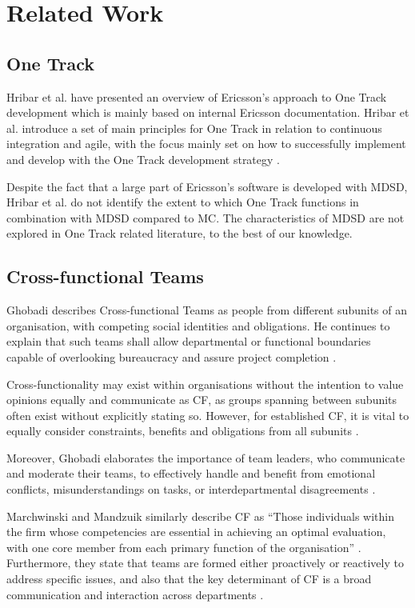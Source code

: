 \documentclass[fina_report_innit.tex]{subfiles}
\begin{document}
\section{Related Work}


\subsection{One Track}
Hribar et al. \cite{hribar2008first} have presented an overview of Ericsson's approach to One Track development which is mainly based on internal Ericsson documentation. Hribar et al. introduce a set of main principles for One Track in relation to continuous integration and agile, with the focus mainly set on how to successfully implement and develop with the One Track development strategy \cite{hribar2008first}.

Despite the fact that a large part of Ericsson's software is developed with MDSD, Hribar et al. do not identify the extent to which One Track functions in combination with MDSD compared to MC. The characteristics of MDSD are not explored in One Track related literature, to the best of our knowledge.

\subsection{Cross-functional Teams}
Ghobadi describes Cross-functional Teams as people from different subunits of an organisation, with competing social identities and obligations. He continues to explain that such teams shall allow departmental or functional boundaries capable of overlooking bureaucracy and assure project completion \cite{ghobadi2011challenges}.

Cross-functionality may exist within organisations without the intention to value opinions equally and communicate as CF, as groups spanning between subunits often exist without explicitly stating so. However, for established CF, it is vital to equally consider constraints, benefits and obligations from all subunits \cite{ghobadi2011challenges}.

Moreover, Ghobadi elaborates the importance of team leaders, who communicate and moderate their teams, to effectively handle and benefit from emotional conflicts, misunderstandings on tasks, or interdepartmental disagreements \cite{ghobadi2011challenges}.

Marchwinski and Mandzuik similarly describe CF as ``Those individuals within the firm whose competencies are essential in achieving an optimal evaluation, with one core member from each primary function of the organisation'' \cite{marchwinski2000technical}. Furthermore, they state that teams are formed either proactively or reactively to address specific issues, and also that the key determinant of CF is a broad communication and interaction across departments \cite{marchwinski2000technical}.
\end{document}
